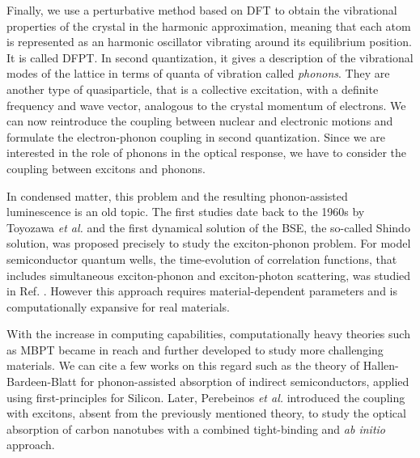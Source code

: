 Finally, we use a perturbative method based on \acrshort{DFT} to obtain the vibrational properties of the crystal in the harmonic approximation, meaning that each atom is represented as an harmonic oscillator vibrating around its equilibrium position. It is called \acrfull{DFPT}.\cite{baroni2001phonons} In second quantization, it gives a description of the vibrational modes of the lattice in terms of quanta of vibration called \textit{phonons}. They are another type of quasiparticle, that is a collective excitation, with a definite frequency and wave vector, analogous to the crystal momentum of electrons. We can now reintroduce the coupling between nuclear and electronic motions and formulate the electron-phonon coupling in second quantization. Since we are interested in the role of phonons in the optical response, we have to consider the coupling between excitons and phonons.

In condensed matter, this problem and the resulting phonon-assisted luminescence is an old topic. The first studies date back to the 1960s by Toyozawa \emph{et al.}\cite{toyozawa2003optical,toyozawa1964interband} and the first dynamical solution of the \acrshort{BSE}, the so-called Shindo solution, was proposed precisely to study the exciton-phonon problem.\cite{shindo1970effective}
For model semiconductor quantum wells, the time-evolution of correlation functions, that includes simultaneous exciton-phonon and exciton-photon scattering, was studied in Ref. \cite{thranhardt2000quantum}. However this approach requires material-dependent parameters and is computationally expansive for real materials.

With the increase in computing capabilities, computationally heavy theories such as \acrshort{MBPT} became in reach and further developed to study more challenging materials. We can cite a few works on this regard such as the theory of Hallen-Bardeen-Blatt for phonon-assisted absorption of indirect semiconductors, \cite{hall1954infrared} applied using first-principles for Silicon.\cite{noffsinger2012phonon} Later, Perebeinos \textit{et al.} introduced the coupling with excitons, absent from the previously mentioned theory, to study the optical absorption of carbon nanotubes with a combined tight-binding and \textit{ab initio} approach.\cite{perebeinos2005effect}

